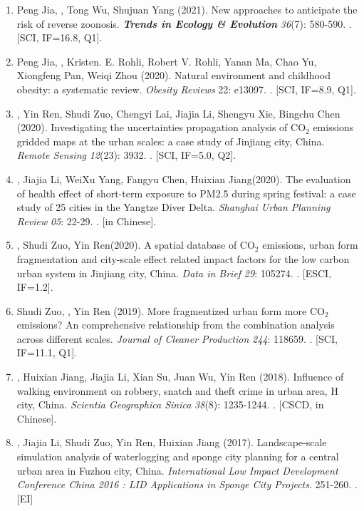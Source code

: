\begin{enumerate}
\item
    Peng Jia\CS, \Shaoqing, Tong Wu, Shujuan Yang (2021).
    New approaches to anticipate the risk of reverse zoonosis.
    \textbf{\textit{Trends in Ecology \& Evolution}} \textit{36}(7): 580-590.
    . [SCI, IF=16.8, Q1].
\item
    Peng Jia\CS, \Shaoqing, Kristen. E. Rohli, Robert V. Rohli, Yanan Ma, Chao Yu, Xiongfeng Pan, Weiqi Zhou (2020).
    Natural environment and childhood obesity: a systematic review.
    \textit{Obesity Reviews} 22: e13097.
    . [SCI, IF=8.9, Q1].
\item
    \Shaoqing\CF, Yin Ren\CF, Shudi Zuo\CS, Chengyi Lai, Jiajia Li, Shengyu Xie, Bingchu Chen (2020).
    Investigating the uncertainties propagation analysis of CO$_2$ emissions gridded maps at the urban scales: a case study of Jinjiang city, China. 
    \textit{Remote Sensing} \textit{12}(23): 3932.
    . [SCI, IF=5.0, Q2].
\item
    \Shaoqing, Jiajia Li, WeiXu Yang, Fangyu Chen, Huixian Jiang\CS (2020).
    The evaluation of health effect of short-term exposure to PM2.5 during spring festival: a case study of 25 cities in the Yangtze Diver Delta.
    \textit{Shanghai Urban Planning Review} \textit{05}: 22-29.
    . [in Chinese].
\item
    \Shaoqing, Shudi Zuo, Yin Ren\CS (2020).
    A spatial database of CO$_2$ emissions, urban form fragmentation and city-scale effect related impact factors for the low carbon urban system in Jinjiang city, China.
    \textit{Data in Brief} \textit{29}: 105274.
    . [ESCI, IF=1.2].
\item
    Shudi Zuo, \Shaoqing, Yin Ren (2019).
    More fragmentized urban form more CO$_2$ emissions? An comprehensive relationship from the combination analysis across different scales.
    \textit{Journal of Cleaner Production} \textit{244}: 118659.
    . [SCI, IF=11.1, Q1].
\item
    \Shaoqing, Huixian Jiang\CS, Jiajia Li, Xian Su, Juan Wu, Yin Ren (2018).
	Influence of walking environment on robbery, snatch and theft crime in urban area, H city, China.
    \textit{Scientia Geographica Sinica}  \textit{38}(8): 1235-1244.
    . [CSCD, in Chinese].
\item
    \Shaoqing, Jiajia Li, Shudi Zuo, Yin Ren, Huixian Jiang (2017).
	Landscape-scale simulation analysis of waterlogging and sponge city planning for a central urban area in Fuzhou city, China.
    \textit{International Low Impact Development Conference China 2016 : LID Applications in Sponge City Projects}. 251-260.
    . [EI]
\end{enumerate}

